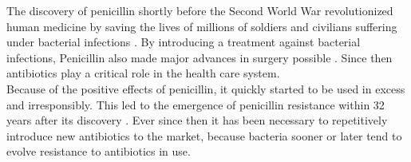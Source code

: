 The discovery of penicillin shortly before the Second World War revolutionized human medicine by saving the lives of millions of soldiers and civilians suffering under bacterial infections \cite{cdc_biggest_2019}. By introducing a treatment against bacterial infections, Penicillin also made major advances in surgery possible \cite{worldwar_resistance}. Since then antibiotics play a critical role in the health care system.\\
Because of the positive effects of penicillin, it quickly started to be used in excess and irresponsibly. This led to the emergence of penicillin resistance within 32 years after its discovery \cite{worldwar_resistance}.
Ever since then it has been necessary to repetitively introduce new antibiotics to the market, because bacteria sooner or later tend to evolve resistance to antibiotics in use. 


